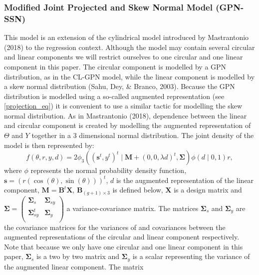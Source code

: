 \documentclass[man,mask]{apa6}
\begin{document}
\subsubsection{Modified Joint Projected and Skew Normal Model (GPN-SSN)}\label{CL-GPN_multivariate}

This model is an extension of the cylindrical model introduced by
Mastrantonio (2018) to the regression context. Although the model may contain
several circular and linear components we will restrict ourselves to one
circular and one linear component in this paper. The circular component is
modelled by a GPN distribution, as in the CL-GPN model, while the linear component is modelled by a skew
normal distribution (Sahu, Dey, \& Branco, 2003). Because the GPN distribution is modelled
using a so-called augmented representation (see \eqref{projection_eq}) it is
convenient to use a similar tactic for modelling the skew normal distribution.
As in Mastrantonio (2018), dependence between the linear and circular
component is created by modelling the augmented representation of \(\Theta\) and
\(Y\) together in a 3 dimensional normal distribution. The joint density of the model is then represented by:
\begin{equation}\label{YDThetarjoint} 
f(\theta, r, y, d) = 2\phi_{3}((\boldsymbol{s}^t,
y^t)^t \mid \boldsymbol{M} + (0,0,\lambda d)^t, \boldsymbol{\Sigma})
\phi(d \mid 0, 1)r, 
\end{equation}
\noindent where \(\phi\) represents the normal probability density function, \(\boldsymbol{s} = (r(\cos(\theta), \sin(\theta)))^t\), \(d\) is
the augmented representation of the linear component, \(\boldsymbol{M} = \boldsymbol{B}^t\boldsymbol{X}\), \(\boldsymbol{B}_{(g + 1) \times 3}\) is
defined below, \(\boldsymbol{X}\) is a design matrix and \(\boldsymbol{\Sigma} = \left ( \begin{matrix} \boldsymbol{\Sigma}_s & \boldsymbol{\Sigma}_{sy} \\ \boldsymbol{\Sigma}_{sy}^t & \boldsymbol{\Sigma}_y \\ \end{matrix} \right )\) a
variance-covariance matrix. The matrices \(\boldsymbol{\Sigma}_s\) and \(\boldsymbol{\Sigma}_y\) are the
covariance matrices for the variances of and covariances between the augmented
representations of the circular and linear component respectively. Note that because we only have one circular and one linear component in this paper, \(\boldsymbol{\Sigma}_s\) is a two by two matrix and \(\boldsymbol{\Sigma}_y\) is a scalar representing the variance of the augmented linear component. The matrix
\end{document}
